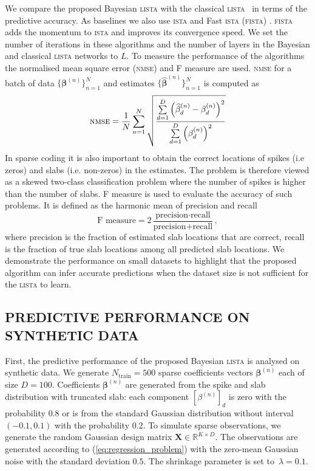 \documentclass[letterpaper]{article}
\begin{document}
We compare the proposed Bayesian \textsc{lista} with the classical \textsc{lista}~\citep{gregor2010learning} in terms of the predictive accuracy. As baselines we also use \textsc{ista} \citep{daubechies2004iterative} and Fast \textsc{ista} (\textsc{fista}) \citep{beck2009fast}. \textsc{fista} adds the momentum to \textsc{ista} and improves its convergence speed. We set the number of iterations in these algorithms and the number of layers in the Bayesian and classical \textsc{lista} networks to $L$. To measure the performance of the algorithms the normalised mean square error (\textsc{nmse}) and F measure are used. \textsc{nmse} for a batch of data $\{\boldsymbol\beta^{(n)}\}_{n=1}^{N}$ and estimates $\{\widehat{\boldsymbol\beta}^{(n)}\}_{n=1}^{N}$ is computed as
\begin{equation}
\text{\textsc{nmse}} = \frac{1}{N}\sum\limits_{n=1}^N\sqrt{\frac{\sum\limits_{d=1}^D\left(\widehat{\beta}_{d}^{(n)} - \beta_d^{(n)}\right)^2}{\sum\limits_{d=1}^D\left(\beta_{d}^{(n)}\right)^2}}
\end{equation}
In sparse coding it is also important to obtain the correct locations of spikes (i.e zeros) and slabs (i.e. non-zeros) in the estimates. The problem is therefore viewed as a skewed two-class classification problem where the number of spikes is higher than the number of slabs. F measure is used to evaluate the accuracy of such problems. It is defined as the harmonic mean of precision and recall
\begin{equation}
\text{F measure} = 2\dfrac{\text{precision}\cdot\text{recall}}{\text{precision} + \text{recall}},
\end{equation}
where precision is the fraction of estimated slab locations that are correct, recall is the fraction of true slab locations among all predicted slab locations.
We demonstrate the performance on small datasets to highlight that the proposed algorithm can infer accurate predictions when the dataset size is not sufficient for the \textsc{lista} to learn.

\subsection{\uppercase{Predictive performance on synthetic data}}
First, the predictive performance of the proposed Bayesian \textsc{lista} is analysed on synthetic data. We generate $N_\text{train}=500$ sparse coefficients vectors $\boldsymbol\beta^{(n)}$ each of size $D = 100$. Coefficients $\boldsymbol\beta^{(n)}$ are generated from the spike and slab distribution with truncated slab: each component $[\beta^{(n)}]_{d}$ is zero with the probability $0.8$ or is from the standard Gaussian distribution without interval $(-0.1, 0.1)$ with the probability $0.2$. To simulate sparse observations, we generate the random Gaussian design matrix $\mathbf{X} \in \mathbb{R}^{K \times D}$.  The observations are generated according to (\ref{eq:regression_problem}) with the zero-mean Gaussian noise with the standard deviation $0.5$. The shrinkage parameter is set to~$\lambda = 0.1$.
\end{document}
